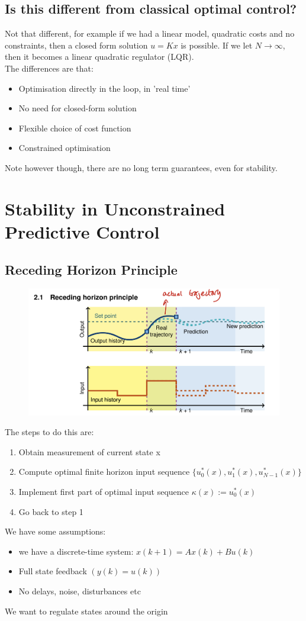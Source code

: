 \documentclass{article}
\begin{document}
\subsection{Is this different from classical optimal control?}
Not that different, for example if we had a linear model, quadratic costs and no constraints, then a closed form solution $u=Kx$ is possible. If we let $N \rightarrow \infty$, then it becomes a linear quadratic regulator (LQR). \\
The differences are that:
\begin{itemize}
    \item Optimisation directly in the loop, in 'real time'
    \item No need for closed-form solution
    \item Flexible choice of cost function
    \item Constrained optimisation
\end{itemize}
Note however though, there are no long term guarantees, even for stability.
\section{Stability in Unconstrained Predictive Control}
\subsection{Receding Horizon Principle}
\begin{figure}[H]
    \centering
    \includegraphics[width=0.8\linewidth]{Screenshot 2023-02-20 at 11.06.33.png}
\end{figure}
The steps to do this are:
\begin{enumerate}
    \item Obtain measurement of current state x
    \item Compute optimal finite horizon input sequence $\{ u_0^*(x), u_1^*(x),u_{N-1}^*(x)\}$
    \item Implement first part of optimal input sequence $\kappa(x) := u_0^*(x)$
    \item Go back to step 1
\end{enumerate}
We have some assumptions:
\begin{itemize}
    \item  we have a discrete-time system: $x(k+1) = Ax(k) + Bu(k)$
    \item Full state feedback $(y(k) = u(k))$
    \item No delays, noise, disturbances etc
\end{itemize}
We want to regulate states around the origin
\end{document}
